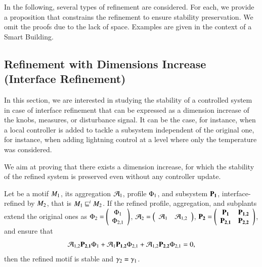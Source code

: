 \documentclass[runningheads]{llncs}
\newcommand{\abstracts}[1][]{\sqsubseteq\ifx#1\relax\else^{#1}\fi}
\newcommand{\isrefinedby}{\abstracts}
\newcommand{\motif}[1][]{M\ifx#1\relax\else^{#1}\fi}
\newcommand{\profile}[1][]{\Phi\ifx#1\relax\else^{#1}\fi}
\newcommand{\aggregation}[1][]{\mathcal{A}\ifx#1\relax\else^{#1}\fi}
\newcommand{\subplant}[1][]{P\ifx#1\relax\else^{#1}\fi}
\newcommand{\margin}[1][]{\gamma\ifx#1\relax\else^{#1}\fi}
\begin{document}
In the following, several types of refinement are considered. For each, we provide a proposition that constrains the refinement to ensure stability preservation. We omit the proofs due to the lack of space. Examples are given in the context of a Smart Building.


\subsection{Refinement with Dimensions Increase (Interface Refinement)}

In  this section, we are interested in studying the stability of a controlled system in case of interface refinement that can be expressed as a dimension increase of the knobs, measures, or disturbance signal. It can be the case, for instance, when a local controller is added to tackle a subsystem independent of the original one, for instance, when adding lightning control at a level where only the temperature was considered. 

We aim at proving that there exists a dimension increase, for which the stability of the refined system is preserved even without any controller update.

\begin{proposition}
    \label{prop:stability-interface-refinement}
    Let be a motif $\motif_1$, its aggregation $\aggregation_1$, profile $\profile_1$, and subsystem $\mathbf{\subplant_1}$,
    interface-refined by $\motif_2$, that is $\motif_{1} \isrefinedby[i] \motif_{2}$.     
    If the refined profile, aggregation, and subplants extend the original ones as     
    $\profile_2 = \left(\begin{array}{c}
         \profile_1\\
         \profile_{2,1}
    \end{array}\right) $, %
    $\aggregation_2 = \left(\begin{array}{cc}
         \aggregation_1 &         \aggregation_{1,2}
    \end{array}\right) $, %
    $\mathbf{\subplant_2} = \left(\begin{array}{cc}
        \mathbf{\subplant_1} & \mathbf{\subplant_{1,2}} \\
        \mathbf{\subplant_{2,1}} & \mathbf{\subplant_{2,2}}
    \end{array}\right)$,
    and ensure that
\begin{equation}
\label{eq:stability-interface-refinement-condition}
\aggregation_{1,2}  \mathbf{\subplant_{2,1}} \profile_1 + \aggregation_1  \mathbf{\subplant_{1,2}}  \profile_{2,1} + \aggregation_{1,2} \mathbf{\subplant_{2,2}} \profile_{2,1} = 0,    
\end{equation}   
then the refined motif is stable and $\margin_2 = \margin_1$.
\end{proposition}
\end{document}
